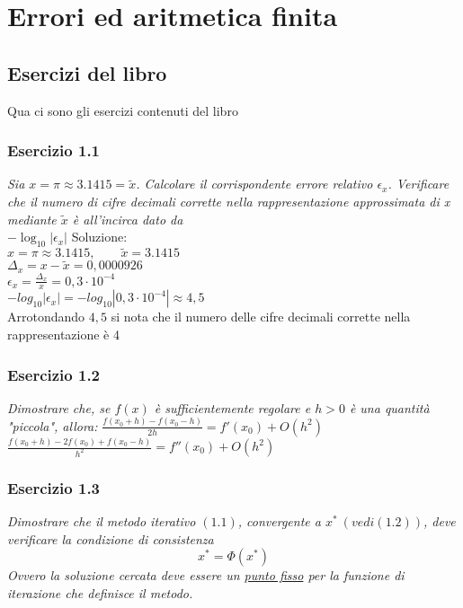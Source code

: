 \chapter{Errori ed aritmetica finita}
\label{chap:Errori ed aritmetica finita}

\section{Esercizi del libro}
Qua ci sono gli esercizi contenuti del libro
\subsection{Esercizio 1.1}
\emph{Sia $ x = \pi \approx 3.1415 = \tilde{x} $. Calcolare il corrispondente errore relativo $\epsilon_{x}$.
Verificare che il numero di cifre decimali corrette nella rappresentazione approssimata di x mediante $\tilde{x}$ è all'incirca dato da}  \\

\center$-\log_{10}|\epsilon_{x}|$
\flushleft Soluzione:\\
\center
$ x = \pi \approx 3.1415, \qquad \tilde{x} = 3.1415 $ \\ \vspace{1ex}
$ \Delta_{x} = x - \tilde{x} = 0,0000926$ \\ \vspace{1ex}
$ \epsilon_{x} = \frac{\Delta_{x}}{x} = 0,3 \cdot 10^{-4} $\\ \vspace{1ex}
$ -log_{10} | \epsilon_{x} | = -log_{10} | 0,3 \cdot 10^{-4} | \approx 4,5  $\\ \vspace{1ex}
\flushleft Arrotondando $ 4,5 $ si nota che il numero delle cifre decimali corrette nella rappresentazione è 4

\subsection{Esercizio 1.2}
\emph{Dimostrare che, se $f(x)$ è sufficientemente regolare e $ h> 0 $ è una quantità "piccola", allora:}
\center$\frac{f(x_{0}+h)-f(x_{0}-h)}{2h} = f'(x_{0})+O(h^2)$ \\
\vspace{1em}
$\frac{f(x_{0}+h)-2f(x_{0})+f(x_{0}-h)}{h^2} = f''(x_{0})+O(h^2) $
\flushleft

\subsection{Esercizio 1.3}
\emph{Dimostrare che il metodo iterativo $(1.1) $, convergente a $ x^* \ (vedi(1.2)) $, deve verificare la condizione di consistenza}
$$ x^* =  \Phi(x^*)$$
\emph{Ovvero la soluzione cercata deve essere un \underline{punto fisso} per la funzione di iterazione che definisce il metodo.}

